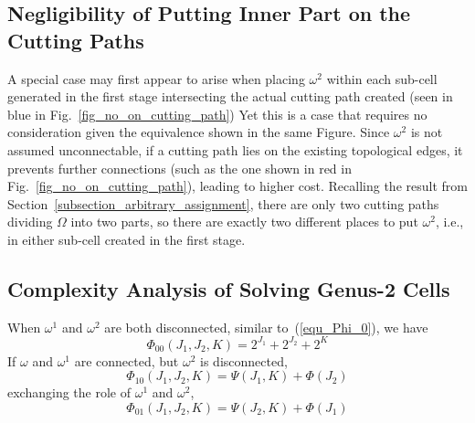 \documentclass[journal]{IEEEtran}
\begin{document}
\subsection{Negligibility of Putting Inner Part on the Cutting Paths}
A special case may first appear to arise when placing $\omega^2$ within each sub-cell generated in the first stage intersecting 
the actual cutting path created (seen in blue in Fig.~\ref{fig_no_on_cutting_path}) 
Yet this is a case that requires no consideration given the equivalence shown in the same Figure. 
Since $\omega^2$ is not assumed unconnectable, if a cutting path lies on the existing topological edges, it prevents further connections
(such as the one shown in red in Fig.~\ref{fig_no_on_cutting_path}), leading to higher cost. 
Recalling the result from Section~\ref{subsection_arbitrary_assignment}, there are only two cutting paths dividing $\Omega$ into two parts, so there are exactly two different places to put $\omega^2$, i.e., in either sub-cell created in the first stage. 

\subsection{Complexity Analysis of Solving Genus-2 Cells}
\label{subsection_genus_two_complexity}
When $\omega^1$ and $\omega^2$ are both disconnected, similar to~(\ref{equ_Phi_0}), we have
\begin{equation}\label{equ_Phi_00}
\Phi_{00}(J_1, J_2, K) = 2^{J_1} +2^{J_2} + 2^K
\end{equation}
If $\omega$ and $\omega^1$ are connected, but $\omega^2$ is disconnected, 
\begin{equation}\label{equ_Phi_10}
\Phi_{10}(J_1, J_2, K) = \Psi(J_1, K)+\Phi(J_2)
\end{equation}
exchanging the role of $\omega^1$ and $\omega^2$, 
\begin{equation}\label{equ_Phi_01}
\Phi_{01}(J_1, J_2, K) = \Psi(J_2, K) + \Phi(J_1)
\end{equation}
\end{document}
